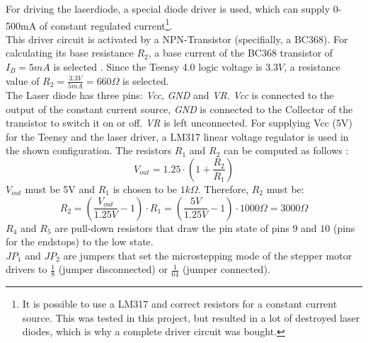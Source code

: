 \documentclass[a4paper, 11pt]{scrartcl}
\begin{document}
For driving the laserdiode, a special diode driver is used, which can supply 0-500mA of constant regulated current\footnote{It is possible to use a LM317 and correct resistors for a constant current source. This was tested in this project, but resulted in a lot of destroyed laser diodes, which is why a complete driver circuit was bought.}. \\
This driver circuit is activated by a NPN-Transistor (specifially, a BC368). For calculating its base resistance $R_2$, a base current of the BC368 transistor of $I_B=5mA$ is selected \cite[p. 3]{SemiconductorComponentsIndustries.2007}. Since the Teensy 4.0 logic voltage is $3.3V$, a resistance value of $R_2=\frac{3.3V}{5mA}=660\Omega$ is selected. \\
The Laser diode has three pins: \textit{Vcc}, \textit{GND} and \textit{VR}. \textit{Vcc} is connected to the output of the constant current source, \textit{GND} is connected to the Collector of the transistor to switch it on or off. \textit{VR} is left unconnected. 
For supplying Vcc (5V) for the Teensy and the laser driver, a LM317 linear voltage regulator is used in the shown configuration. The resistors $R_1$ and $R_2$ can be computed as follows \cite[p. 10]{lm317}: 
\begin{equation}
V_{out} = 1.25 \cdot \left( 1+\frac{R_2}{R_1} \right)
\end{equation}
$V_{out}$ must be 5V and $R_1$ is chosen to be $1k\Omega$. Therefore, $R_2$ must be:
\begin{equation}
R_2 = \left( \frac{V_{out}}{1.25V} - 1 \right) \cdot R_1 =  \left( \frac{5V}{1.25V} - 1 \right) \cdot 1000\Omega = 3000\Omega
\end{equation}
$R_4$ and $R_5$ are pull-down resistors that draw the pin state of pins $9$ and $10$ (pins for the endstops) to the low state. \\
$JP_1$ and $JP_2$ are jumpers that set the microstepping mode of the stepper motor drivers to $\frac{1}{8}$ (jumper disconnected) or $\frac{1}{64}$ (jumper connected).
\end{document}

